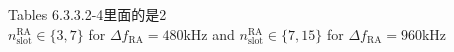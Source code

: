 \documentclass{article}
\begin{document}
\begin{itemize}
\begin{itemize}
\begin{itemize}
\begin{itemize}
			Tables 6.3.3.2-4里面的{\color{darkred}{Number of PRACH slots within a 60 kHz slot}}是2\\
			$n^{\text{RA}}_{\text{slot}}\in\{3,7\}$ for $\Delta f_{\text{RA}}=480$kHz and $n^{\text{RA}}_{\text{slot}}\in\{7,15\}$ for $\Delta f_{\text{RA}}=960$kHz
			\end{itemize}
		
		
		
		\end{itemize}
	\end{itemize}


\end{itemize}

\newpage


\end{document}
